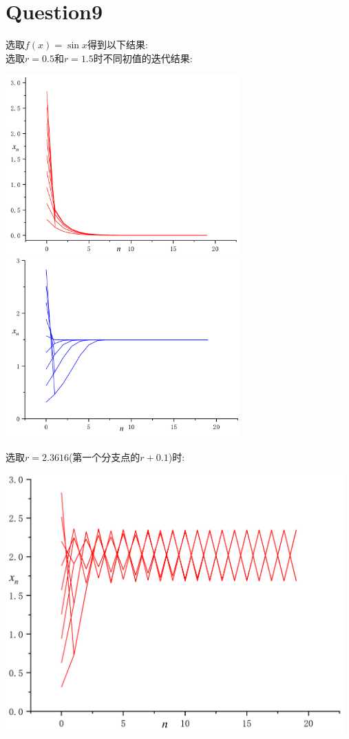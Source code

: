 \documentclass[UTF8]{ctexart}
\begin{document}
    \section{Question9}
        \indent 选取$f(x)=\sin x$得到以下结果:\\
        \indent 选取$r=0.5$和$r=1.5$时不同初值的迭代结果:
        \begin{center}
            \includegraphics[width=9cm]{q9/r0_5.pdf}
            \includegraphics[width=9cm]{q9/r1_5.pdf}
        \end{center}
        \indent 选取$r=2.3616$(第一个分支点的$r+0.1$)时:
        \begin{center}
            \includegraphics[width=13cm]{q9/r2_36.pdf}
        \end{center}
\end{document}
